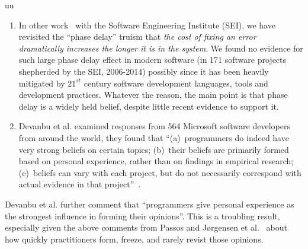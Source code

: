 uu \documentclass[final,twocolumn,5p]{elsarticle}
\theoremstyle{break}
\begin{document}
\begin{enumerate} 
\item
In other work~\cite{me16phase} with the Software Engineering Institute (SEI), we have revisited
the ``phase delay'' truism that {\em the cost of fixing an error dramatically increases the longer it is in the system}. 
We found no evidence for such large   phase delay effect in modern
software (in 171 software projects shepherded
by the SEI, 2006-2014) possibly since it has been  heavily mitigated by $21^{st}$ century software development languages, tools and development practices. 
Whatever the reason, the main point  is that phase delay is a widely
held belief, despite little recent evidence to support it.
\item
Devanbu et al.  examined responses from 564 Microsoft software developers from around
the world, they found that  ``(a)~programmers do indeed have very
strong beliefs on certain topics; (b)~their beliefs are primarily formed
based on personal experience, rather than on findings in empirical
research; (c)~beliefs can vary with each project, but do not necessarily
correspond with actual evidence in that project''~\cite{prem16}.
\end{enumerate}
Devanbu et al. further  comment that ``programmers give personal experience
as the strongest influence in forming their opinions''. This is a troubling
result, especially given the above comments from Passos and  J{\o}rgensen et al.~\cite{passos11,jorgensen09} about how quickly practitioners form, freeze, and rarely revist those opinions.




\end{document}
